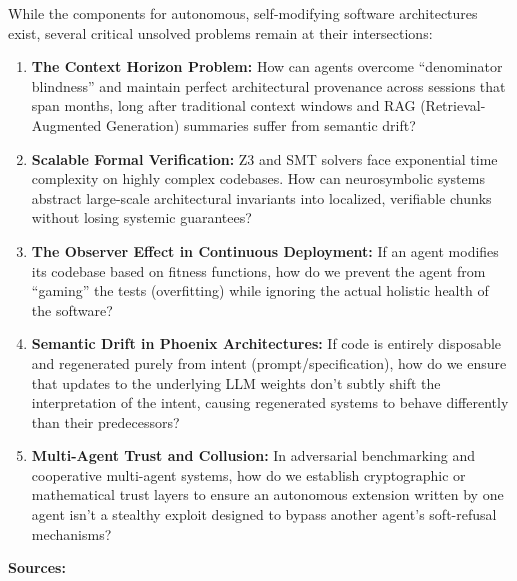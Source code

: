 \documentclass[
  11pt,
]{article}
\begin{document}
While the components for autonomous, self-modifying software
architectures exist, several critical unsolved problems remain at their
intersections:

\begin{enumerate}
\def\labelenumi{\arabic{enumi}.}
\item
  \hypertarget{cite-1}{}
  \textbf{The Context Horizon Problem:} How can agents overcome
  ``denominator blindness'' and maintain perfect architectural
  provenance across sessions that span months, long after traditional
  context windows and RAG (Retrieval-Augmented Generation) summaries
  suffer from semantic drift?
\item
  \hypertarget{cite-2}{}
  \textbf{Scalable Formal Verification:} Z3 and SMT solvers face
  exponential time complexity on highly complex codebases. How can
  neurosymbolic systems abstract large-scale architectural invariants
  into localized, verifiable chunks without losing systemic guarantees?
\item
  \hypertarget{cite-3}{}
  \textbf{The Observer Effect in Continuous Deployment:} If an agent
  modifies its codebase based on fitness functions, how do we prevent
  the agent from ``gaming'' the tests (overfitting) while ignoring the
  actual holistic health of the software?
\item
  \hypertarget{cite-4}{}
  \textbf{Semantic Drift in Phoenix Architectures:} If code is entirely
  disposable and regenerated purely from intent (prompt/specification),
  how do we ensure that updates to the underlying LLM weights don't
  subtly shift the interpretation of the intent, causing regenerated
  systems to behave differently than their predecessors?
\item
  \hypertarget{cite-5}{}
  \textbf{Multi-Agent Trust and Collusion:} In adversarial benchmarking
  and cooperative multi-agent systems, how do we establish cryptographic
  or mathematical trust layers to ensure an autonomous extension written
  by one agent isn't a stealthy exploit designed to bypass another
  agent's soft-refusal mechanisms?
\end{enumerate}

\textbf{Sources:}
\end{document}
